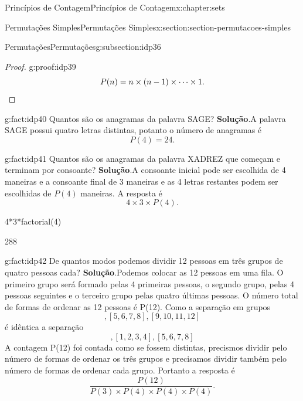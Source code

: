 \documentclass[oneside,10pt,]{book}
\newcommand{\blocktitlefont}{\relax}
\newcommand{\qedhere}{\relax}
\numberwithin{equation}{section}
\begin{document}
\begin{chapterptx}{Princípios de Contagem}{}{Princípios de Contagem}{}{}{x:chapter:sets}
\begin{sectionptx}{Permutações Simples}{}{Permutações Simples}{}{}{x:section:section-permutacoes-simples}
\begin{subsectionptx}{Permutações}{}{Permutações}{}{}{g:subsection:idp36}
\begin{proof}{}{g:proof:idp39}
\begin{equation*}
P(n) = n\times (n-1) \times \cdots \times 1. \qedhere
\end{equation*}
%
\end{proof}
\begin{fact}{}{}{g:fact:idp40}%
Quantos são os anagramas da palavra SAGE?%
\textbf{\blocktitlefont Solução}.\quad{}A palavra SAGE possui quatro letras distintas, potanto o número de anagramas é%
\begin{equation*}
P(4) = 24. 
\end{equation*}
%
\end{fact}
\begin{fact}{}{}{g:fact:idp41}%
Quantos são os anagramas da palavra XADREZ que começam e terminam por consoante?%
\textbf{\blocktitlefont Solução}.\quad{}A consoante inicial pode ser escolhida de 4 maneiras e a consoante final de 3 maneiras e as 4 letras restantes podem ser escolhidas de \(P(4)\) maneiras. A resposta é%
\begin{equation*}
4\times 3\times P(4). 
\end{equation*}
%
\begin{sageinput}
4*3*factorial(4)
\end{sageinput}
\begin{sageoutput}
288
\end{sageoutput}
\end{fact}
\begin{fact}{}{}{g:fact:idp42}%
De quantos modos podemos dividir 12 pessoas em três grupos de quatro pessoas cada?%
\textbf{\blocktitlefont Solução}.\quad{}Podemos colocar as 12 pessoas em uma fila. O primeiro grupo será formado pelas 4 primeiras pessoas, o segundo grupo, pelas 4 pessoas seguintes e o terceiro grupo pelas quatro últimas pessoas. O número total de formas de ordenar as 12 pessoas é P(12). Como a separação em grupos%
\begin{equation*}
[1, 2, 3, 4], [5, 6, 7, 8], [9, 10, 11, 12]
\end{equation*}
é idêntica a separação%
\begin{equation*}
[9, 10, 11, 12], [1, 2, 3, 4], [5, 6, 7, 8]
\end{equation*}
A contagem P(12) foi contada como se fossem distintas, precismos dividir pelo número de formas de ordenar os três grupos e precisamos dividir também pelo número de formas de ordenar cada grupo. Portanto a resposta é%
\begin{equation*}
\frac{P(12)}{P(3)\times P(4)\times P(4)\times P(4)}.
\end{equation*}

\end{fact}
\end{subsectionptx}
\end{sectionptx}
\end{chapterptx}
\end{document}
